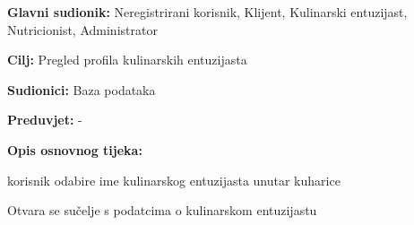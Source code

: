 					\noindent {}
					\begin{packed_item}
	
						\item \textbf{Glavni sudionik: }Neregistrirani korisnik, Klijent, Kulinarski entuzijast, Nutricionist, Administrator
						\item  \textbf{Cilj:} Pregled profila kulinarskih entuzijasta
						\item  \textbf{Sudionici:} Baza podataka
						\item  \textbf{Preduvjet:} -
						\item  \textbf{Opis osnovnog tijeka:} 
						
						\item[] \begin{packed_enum}
	
							\item korisnik odabire ime kulinarskog entuzijasta unutar kuharice
							\item Otvara se sučelje s podatcima o kulinarskom entuzijastu
						\end{packed_enum}
						

					\end{packed_item}



